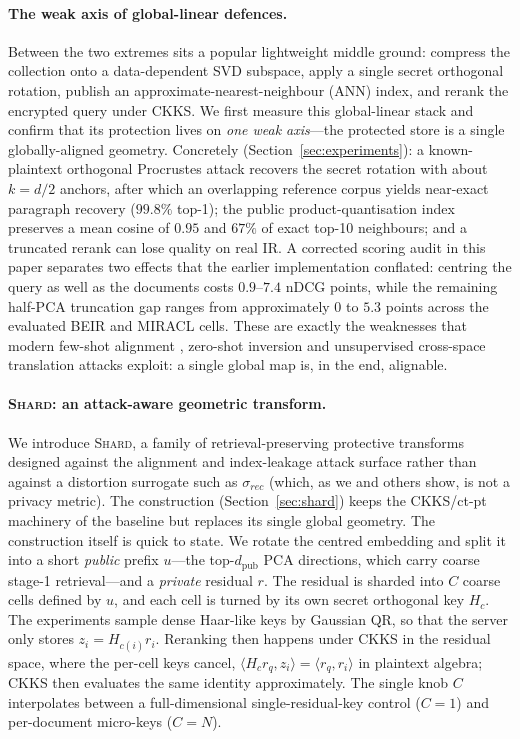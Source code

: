 \documentclass[11pt,a4paper]{article}
\begin{document}
\paragraph{The weak axis of global-linear defences.} Between the two
extremes sits a popular lightweight middle ground: compress the collection
onto a data-dependent SVD subspace, apply a single secret orthogonal
rotation, publish an approximate-nearest-neighbour (ANN) index, and rerank
the encrypted query under CKKS. We first measure this global-linear stack
and confirm that its protection lives on \emph{one weak axis}---the
protected store is a single globally-aligned geometry. Concretely
(Section~\ref{sec:experiments}): a known-plaintext orthogonal Procrustes
attack recovers the secret rotation with about $k=d/2$ anchors, after which
an overlapping reference corpus yields near-exact paragraph recovery
($99.8\%$ top-1); the public product-quantisation index preserves a mean
cosine of $0.95$ and $67\%$ of exact top-10 neighbours; and a truncated
rerank can lose quality on real IR. A corrected scoring audit in this paper
separates two effects that the earlier implementation conflated: centring the
query as well as the documents costs $0.9$--$7.4$ nDCG points, while the
remaining half-PCA truncation gap ranges from approximately $0$ to $5.3$
points across the evaluated BEIR and MIRACL cells. These are
exactly the weaknesses that modern few-shot alignment \cite{ref_algen},
zero-shot inversion \cite{ref_zsinvert} and unsupervised cross-space
translation \cite{ref_vec2vec} attacks exploit: a single global map is, in
the end, alignable.

\paragraph{\textsc{Shard}: an attack-aware geometric transform.} We
introduce \textsc{Shard}, a family of retrieval-preserving protective
transforms designed against the alignment and index-leakage attack surface
rather than against a distortion surrogate such as $\sigma_{rec}$ (which,
as we and others show, is not a privacy metric). The construction
(Section~\ref{sec:shard}) keeps the CKKS/ct-pt machinery of the baseline
but replaces its single global geometry. The construction itself is quick to state. We rotate the
centred embedding and split it into a short \emph{public} prefix $u$---the
top-$d_{\mathrm{pub}}$ PCA directions, which carry coarse stage-1
retrieval---and a \emph{private} residual $r$. The residual is sharded into
$C$ coarse cells defined by $u$, and each cell is turned by its own secret
orthogonal key $H_c$. The experiments sample dense Haar-like keys by Gaussian
QR, so that the server only stores $z_i = H_{c(i)} r_i$. Reranking then happens under CKKS in
the residual space, where the per-cell keys cancel,
$\langle H_c r_q, z_i\rangle=\langle r_q, r_i\rangle$ in plaintext algebra;
CKKS then evaluates the same identity approximately. The single knob $C$
interpolates between a full-dimensional single-residual-key control
($C{=}1$) and per-document micro-keys
($C{=}N$).
\end{document}
